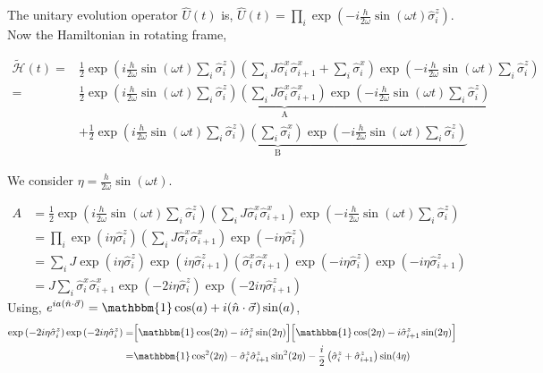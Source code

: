 \documentclass[aps,prb,reprint,showpacs,floatfix,superscriptaddress, onecolumn, nofootinbib, 9pt]{revtex4-2}
\begin{document}
\begin{enumerate}
{The unitary evolution operator $\displaystyle \hat{U}(t)$ is, $\hat{U}(t)=\prod_{i} \exp \left(-i \frac{h}{2 \omega} \sin (\omega t) \hat{\sigma}_{i}^{z}\right)$. Now the Hamiltonian in rotating frame,

\begin{align}
	\tilde{\mathcal{H}}(t)= & \frac{1}{2} \exp \left(i \frac{h}{2 \omega} \sin (\omega t) \sum_{i} \hat{\sigma}_{i}^{z}\right)\left(\sum_{i} J \hat{\sigma}_{i}^{x} \hat{\sigma}_{i+1}^{x}+\sum_{i} \hat{\sigma}_{i}^{x}\right) \exp \left(-i \frac{h}{2 \omega} \sin (\omega t) \sum_i\hat{\sigma}_{i}^{z}\right) \nonumber\\
	= & \underbrace{\frac{1}{2} \exp \left(i \frac{h}{2 \omega} \sin (\omega t) \sum_{i} \hat{\sigma}_{i}^{z}\right)\left(\sum_{i} J \hat{\sigma}_{i}^{x} \hat{\sigma}_{i+1}^{x}\right) \exp \left(-i \frac{h}{2 \omega} \sin (\omega t) \sum_i\hat{\sigma}_{i}^{z}\right)}_{\mathrm{A}} \nonumber\\
	& +\underbrace{\frac{1}{2} \exp \left(i \frac{h}{2 \omega} \sin (\omega t) \sum_{i} \hat{\sigma}_{i}^{z}\right)\left(\sum_{i} \hat{\sigma}_{i}^{x}\right) \exp \left(-i \frac{h}{2 \omega} \sin (\omega t) \sum_i\hat{\sigma}_{i}^{z}\right)}_{\mathrm{B}}
\end{align}

We consider $\eta=\frac{h}{2 \omega} \sin (\omega t)$.


\begin{align}
	A & =\frac{1}{2} \exp \left(i \frac{h}{2 \omega} \sin (\omega t) \sum_{i} \hat{\sigma}_{i}^{z}\right)\left(\sum_{i} J \hat{\sigma}_{i}^{x} \hat{\sigma}_{i+1}^{x}\right) \exp \left(-i \frac{h}{2 \omega} \sin (\omega t) \sum_i\hat{\sigma}_{i}^{z}\right) \nonumber\\
	&= \prod_i \exp\left(i\eta\hat{\sigma}^z_i\right)\left(\sum_{i} J \hat{\sigma}_{i}^{x} \hat{\sigma}_{i+1}^{x}\right)\exp\left(-i\eta\hat{\sigma}^z_i\right)\nonumber\\
	&= \sum_i J \exp(i\eta\hat{\sigma}^z_i)\exp(i\eta\hat{\sigma}^z_{i+1})\left( \hat{\sigma}_{i}^{x} \hat{\sigma}_{i+1}^{x}\right)\exp(-i\eta\hat{\sigma}^z_i)\exp(-i\eta\hat{\sigma}^z_{i+1})\nonumber\\
	&= J\sum_{i} \hat{\sigma}_{i}^{x} \hat{\sigma}_{i+1}^{x}\exp(-2i\eta\hat{\sigma}^z_i)\exp(-2i\eta\hat{\sigma}^z_{i+1})
	\label{eq:hmov}
\end{align}
Using, $\displaystyle e^{ia(\hat{n}\cdot \vec{\sigma})} = \mathbbm{1} \cos(a) + i (\hat{n}\cdot \vec{\sigma})\sin(a)$, 
\begin{align}
	\exp\left(-2i\eta\hat{\sigma}^z_i\right)\exp\left(-2i\eta\hat{\sigma}^z_i\right)
	=& \Big[\mathbbm{1} \cos(2\eta) - i \hat{\sigma}^z_i\sin(2\eta)\Big]\Big[\mathbbm{1} \cos(2\eta) - i \hat{\sigma}^z_{i+1}\sin(2\eta)\Big]\nonumber\\
	=& \mathbbm{1} \cos^2(2\eta) - \hat{\sigma}^z_i\hat{\sigma}^z_{i+1}\sin^2(2\eta) -\frac{i}{2} \left(\hat{\sigma}^z_i+ \hat{\sigma}^z_{i+1}\right)\sin(4\eta)
	\label{eq:op}
\end{align}

}
\end{enumerate}
\end{document}
